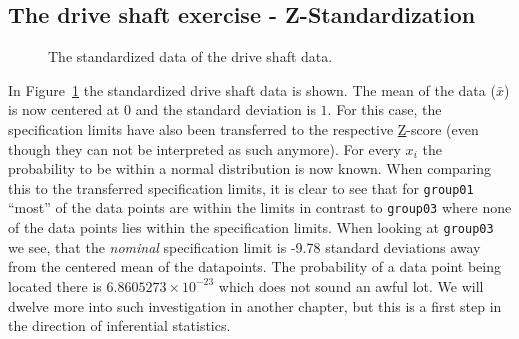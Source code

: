 \documentclass[
  a4paper,
]{scrbook}
\begin{document}
\subsection{The drive shaft exercise -
Z-Standardization}\label{the-drive-shaft-exercise---z-standardization}

\begin{figure}[H]


\caption{\label{fig-ds-z}The standardized data of the drive shaft data.}

\end{figure}%

In Figure~\ref{fig-ds-z} the standardized drive shaft data is shown. The
mean of the data (\(\bar{x}\)) is now centered at \(0\) and the standard
deviation is \(1\). For this case, the specification limits have also
been transferred to the respective \hyperref[acronyms_Z]{Z}-score (even
though they can not be interpreted as such anymore). For every \(x_i\)
the probability to be within a normal distribution is now known. When
comparing this to the transferred specification limits, it is clear to
see that for \texttt{group01} ``most'' of the data points are within the
limits in contrast to \texttt{group03} where none of the data points
lies within the specification limits. When looking at \texttt{group03}
we see, that the \emph{nominal} specification limit is -9.78 standard
deviations away from the centered mean of the datapoints. The
probability of a data point being located there is
\ensuremath{6.8605273\times 10^{-23}} which does not sound an awful lot.
We will dwelve more into such investigation in another chapter, but this
is a first step in the direction of inferential statistics.
\end{document}
